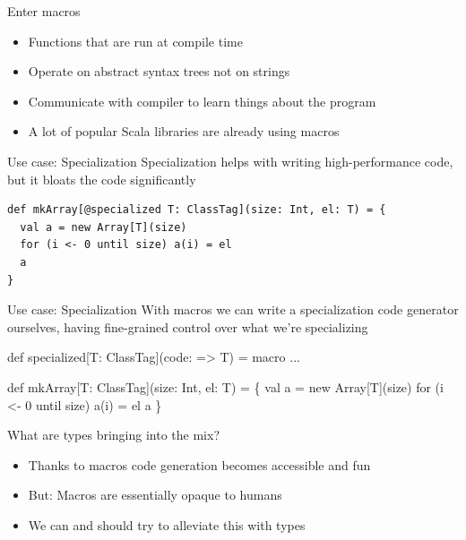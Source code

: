 \documentclass[compress,xcolor={usenames,dvipsnames,table}]{beamer}
\begin{document}

\begin{frame}{Enter macros}
  \begin{itemize}
    \item Functions that are run at compile time
    \item Operate on abstract syntax trees not on strings
    \item Communicate with compiler to learn things about the program
    \item A lot of popular Scala libraries are already using macros
  \end{itemize}
\end{frame}

\begin{frame}[fragile]{Use case: Specialization}
  Specialization helps with writing high-performance code,
  but it bloats the code significantly

  \vspace{1em}
  \begin{verbatim}
def mkArray[@specialized T: ClassTag](size: Int, el: T) = {
  val a = new Array[T](size)
  for (i <- 0 until size) a(i) = el
  a
}
  \end{verbatim}
\end{frame}

\begin{frame}[fragile]{Use case: Specialization}
  With macros we can write a specialization code generator ourselves,
  having fine-grained control over what we're specializing

  \vspace{1em}
  \begin{semiverbatim}
def specialized[T: ClassTag](code: => T) = macro ...

def mkArray[T: ClassTag](size: Int, el: T) = \{
  val a = new Array[T](size)
    for (i <- 0 until size) a(i) = el
  \text{\color{blue}{\}}}
  a
\}
  \end{semiverbatim}
\end{frame}

\begin{frame}{What are types bringing into the mix?}
  \begin{itemize}
    \item Thanks to macros code generation becomes accessible and fun
    \item But: Macros are essentially opaque to humans
    \item We can and should try to alleviate this with types
  \end{itemize}
\end{frame}
\end{document}
